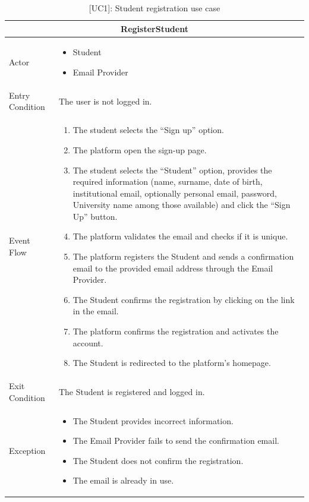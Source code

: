 \begin{table}[H]
    \centering
    \begin{tabular}{|p{3cm}|p{12cm}|}
    \hline
    \multicolumn{2}{|c|}{\textbf{RegisterStudent}} \\ \hline
    Actor & 
    \begin{itemize}
        \item Student
        \item Email Provider
    \end{itemize} \\ \hline
    Entry Condition & The user is not logged in. \\ \hline
    Event Flow & 
    \begin{enumerate}         
        \item The student selects the “Sign up” option.
        \item The platform open the sign-up page.
        \item The student selects the “Student” option, provides the required information (name, surname, date of birth, institutional email, optionally personal email, password, University name among those available) and click the “Sign Up” button.
        \item The platform validates the email and checks if it is unique.
        \item The platform registers the Student and sends a confirmation email to the provided email address through the Email Provider.
        \item The Student confirms the registration by clicking on the link in the email.
        \item The platform confirms the registration and activates the account.
        \item The Student is redirected to the platform's homepage.
    \end{enumerate} \\ \hline
    Exit Condition & The Student is registered and logged in. \\ \hline
    Exception & 
    \begin{itemize}
        \item The Student provides incorrect information.
        \item The Email Provider fails to send the confirmation email.
        \item The Student does not confirm the registration.
        \item The email is already in use.
    \end{itemize} \\ \hline
    \end{tabular}
    \caption{[UC1]: Student registration use case}
    \label{tab:UC1}
\end{table}

